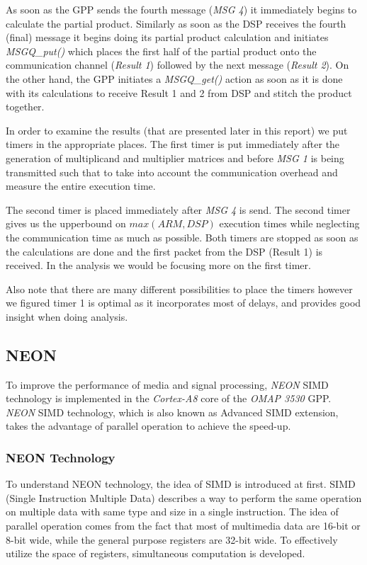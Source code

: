 As soon as the GPP sends the fourth message (\emph{MSG 4}) it immediately begins to calculate the partial product. Similarly as soon as the DSP receives the fourth (final) message it begins doing its partial product calculation and initiates \emph{MSGQ\_put()} which places the first half of the partial product onto the communication channel (\emph{Result 1}) followed by the next message (\emph{Result 2}). On the other hand, the GPP initiates a \emph{MSGQ\_get()} action as soon as it is done with its calculations to receive Result 1 and 2 from DSP and stitch the product together.

In order to examine the results (that are presented later in this report) we put timers in the appropriate places. The first timer is put immediately after the generation of multiplicand and multiplier matrices and before \emph{MSG 1} is being transmitted such that to take into account the communication overhead and measure the entire execution time.

The second timer is placed immediately after \emph{MSG 4} is send. The second timer gives us the upperbound on $max(ARM, DSP)$ execution times while neglecting the communication time as much as possible. Both timers are stopped as soon as the calculations are done and the first packet from the DSP (Result 1) is received. In the analysis we would be focusing more on the first timer.

Also note that there are many different possibilities to place the timers however we figured timer 1 is optimal as it incorporates most of delays, and provides good insight when doing analysis.

\subsection{NEON}
To improve the performance of media and signal processing, 
\emph{NEON} SIMD technology is implemented in the \emph{Cortex-A8} core of the \emph{OMAP 3530} GPP. 
\emph{NEON} SIMD technology, which is also known as Advanced SIMD extension, 
takes the advantage of parallel operation to achieve the speed-up.
\subsubsection{NEON Technology} 
To understand NEON technology, the idea of SIMD is introduced at first. 
SIMD (Single Instruction Multiple Data) describes a way to perform the same operation on multiple data with same type and size in a single instruction. 
The idea of parallel operation comes from the fact that most of multimedia data are 16-bit or 8-bit wide, while the general purpose registers are 32-bit wide. To effectively utilize the space of registers, simultaneous computation is developed.

